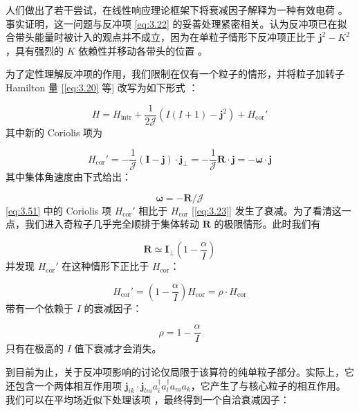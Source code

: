 人们做出了若干尝试，在线性响应理论框架下将衰减因子解释为一种有效电荷 \cite{BPC72,HK75}。事实证明，这一问题与反冲项
\ref{eq:3.22} 的妥善处理紧密相关。认为反冲项已在拟合带头能量时被计入的观点并不成立，因为在单粒子情形下反冲项正比于
$\boldsymbol{j}^{2}-K^{2}$，具有强烈的 $K$ 依赖性并移动各带头的位置 \cite{ORG75}。

为了定性理解反冲项的作用，我们限制在仅有一个粒子的情形，并将粒子加转子 Hamilton 量 {[}\ref{eq:3.20} 等{]}
改写为如下形式 \cite{Kr79}：

\begin{equation}
H=H_{\text{intr}}+\frac{1}{2\mathcal{J}}\left(I(I+1)-\boldsymbol{j}^{2}\right)+H_{\text{cor}}'\label{eq:3.50}
\end{equation}
其中新的 Coriolis 项为

\begin{equation}
H_{\text{cor}}'=-\frac{1}{\mathcal{J}}(\boldsymbol{I}-\boldsymbol{j})\cdot\boldsymbol{j}_{\perp}=-\frac{1}{\mathcal{J}}\boldsymbol{R}\cdot\boldsymbol{j}=-\boldsymbol{\omega}\cdot\boldsymbol{j}\label{eq:3.51}
\end{equation}
其中集体角速度由下式给出：

\begin{equation}
\boldsymbol{\omega}=-\boldsymbol{R}/\mathcal{J}\label{eq:3.52}
\end{equation}
\ref{eq:3.51} 中的 Coriolis 项 $H_{\text{cor}}'$ 相比于 $H_{\text{cor}}$
{[}\ref{eq:3.23}{]} 发生了衰减。为了看清这一点，我们进入奇粒子几乎完全顺排于集体转动 $\boldsymbol{R}$
的极限情形。此时我们有

\begin{equation}
\boldsymbol{R}\simeq\boldsymbol{I}_{\perp}\left(1-\frac{\alpha}{I}\right)\label{eq:3.53}
\end{equation}
并发现 $H_{\text{cor}}'$ 在这种情形下正比于 $H_{\text{cor}}$：

\begin{equation}
H_{\text{cor}}'=\left(1-\frac{\alpha}{I}\right)H_{\text{cor}}=\rho\cdot H_{\text{cor}}\label{eq:3.54}
\end{equation}
带有一个依赖于 $I$ 的衰减因子：

\begin{equation}
\rho=1-\frac{\alpha}{I}\label{eq:3.55}
\end{equation}
只有在极高的 $I$ 值下衰减才会消失。

到目前为止，关于反冲项影响的讨论仅局限于该算符的纯单粒子部分。实际上，它还包含一个两体相互作用项 $\boldsymbol{j}_{ik}\cdot\boldsymbol{j}_{lm}a^{\dagger}_{i}a^{\dagger}_{l}a_{m}a_{k}$，它产生了与核心粒子的相互作用。我们可以在平均场近似下处理该项
\cite{Ri77}，最终得到一个自洽衰减因子：

